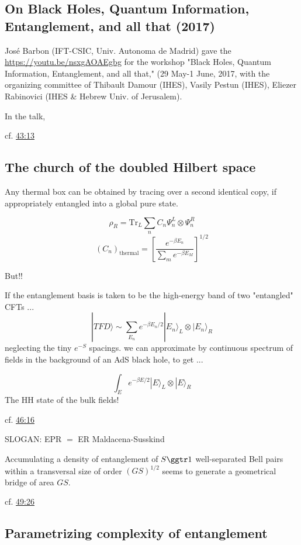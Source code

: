 \documentclass[10pt, twoside]{amsart}
\begin{document}
\begin{multicols*}{2}
\section{On Black Holes, Quantum Information, Entanglement, and all that (2017) }  

Jos\'{e} Barbon (IFT-CSIC, Univ. Autonoma de Madrid) gave the \href{Workshop introductory overview}{https://youtu.be/nsxgAOAEgbg} for the workshop "Black Holes, Quantum Information, Entanglement, and all that," (29 May-1 June, 2017, with the organizing committee of Thibault Damour (IHES), Vasily Pestun (IHES), Eliezer Rabinovici (IHES & Hebrew Univ. of Jerusalem).  

In the talk, 

cf. \href{https://youtu.be/nsxgAOAEgbg?t=43m13s}{43:13}  

\subsection*{The church of the doubled Hilbert space}
 
Any thermal box can be obtained by tracing over a second identical copy, if appropriately entangled into a global pure state.  

\[
\rho_R = \text{Tr}_L \sum_n C_n \Psi_n^L \otimes \Psi_n^R
\]
\[
(C_n)_{\text{thermal}} = \left[ \frac{ e^{-\beta E_n} }{ \sum_m e^{-\beta E_M} } \right]^{1/2}
\]

But!!

If the entanglement basis is taken to be the high-energy band of two "entangled" CFTs ... 
\[
|TFD \rangle \sim \sum_{E_n} e^{-\beta E_n/2} | E_n \rangle_L \otimes | E_n \rangle_R
\]
neglecting the tiny $e^{-S}$ spacings. we can approximate by continuous spectrum of fields in the background of an AdS black hole, to get ... 
 
\[
\int_E e^{-\beta E/2} |E\rangle_L \otimes | E\rangle_R 
\]
The HH state of the bulk fields!  

cf. \href{https://youtu.be/nsxgAOAEgbg?t=46m16s}{46:16}

SLOGAN: EPR $=$ ER
Maldacena-Susskind  

Accumulating a density of entanglement of $S \ggtr 1$ well-separated Bell pairs within a transversal size of order $(GS)^{1/2}$  seems to generate a geometrical bridge of area $GS$.  




cf. \href{https://youtu.be/nsxgAOAEgbg?t=49m26s}{49:26}  

\subsection*{Parametrizing complexity of entanglement}


\end{multicols*}
\end{document}
